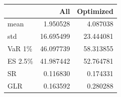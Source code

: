 \begin{tabular}{lrr}
\toprule
 & All & Optimized \\
\midrule
mean & 1.950528 & 4.087038 \\
std & 16.695499 & 23.444081 \\
VaR 1\% & 46.097739 & 58.313855 \\
ES 2.5\% & 41.987442 & 52.764781 \\
SR & 0.116830 & 0.174331 \\
GLR & 0.163592 & 0.280288 \\
\bottomrule
\end{tabular}
